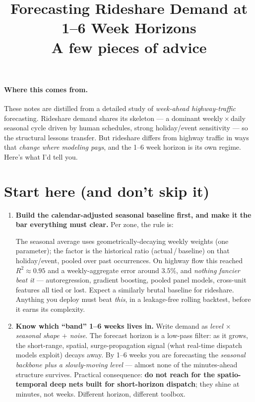 \documentclass[11pt]{article}
\title{\textbf{Forecasting Rideshare Demand at 1--6 Week Horizons}\\[3pt]
\large A few pieces of advice}
\author{}
\date{}
\begin{document}
\maketitle
\vspace{-2.5em}

\noindent\hrulefill

\paragraph{Where this comes from.} These notes are distilled from a detailed study
of \emph{week-ahead highway-traffic} forecasting. Rideshare demand shares its
skeleton --- a dominant weekly\,$\times$\,daily seasonal cycle driven by human
schedules, strong holiday/event sensitivity --- so the structural lessons transfer.
But rideshare differs from highway traffic in ways that \emph{change where modeling
pays}, and the 1--6 week horizon is its own regime. Here's what I'd tell you.

\section{Start here (and don't skip it)}

\begin{enumerate}[leftmargin=*]
\item \textbf{Build the calendar-adjusted seasonal baseline first, and make it the
bar everything must clear.} Per zone, the rule is:
\begin{center}
\end{center}
The seasonal average uses geometrically-decaying weekly weights (one parameter);
the factor is the historical ratio (actual\,/\,baseline) on that holiday/event,
pooled over past occurrences. On highway flow this reached $R^2\approx0.95$ and a
weekly-aggregate error around $3.5\%$, and \emph{nothing fancier beat it} ---
autoregression, gradient boosting, pooled panel models, cross-unit features all
tied or lost. Expect a similarly brutal baseline for rideshare. Anything you deploy
must beat \emph{this}, in a leakage-free rolling backtest, before it earns its
complexity.

\item \textbf{Know which ``band'' 1--6 weeks lives in.} Write demand as
\emph{level $\times$ seasonal shape $+$ noise}. The forecast horizon is a low-pass
filter: as it grows, the short-range, spatial, surge-propagation signal (what
real-time dispatch models exploit) decays away. By 1--6 weeks you are forecasting
the \emph{seasonal backbone plus a slowly-moving level} --- almost none of the
minutes-ahead structure survives. Practical consequence: \textbf{do not reach for
the spatio-temporal deep nets built for short-horizon dispatch}; they shine at
minutes, not weeks. Different horizon, different toolbox.
\end{enumerate}
\end{document}
